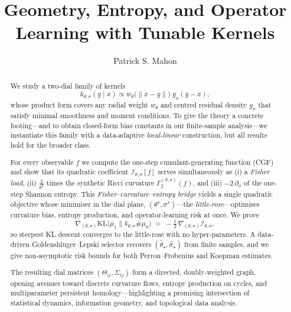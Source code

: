 \documentclass{article}
\theoremstyle{plain}
\theoremstyle{definition}
\theoremstyle{remark}
\begin{document}
\title{Geometry, Entropy, and Operator Learning with Tunable Kernels}
\author{Patrick S. Mahon}
\maketitle


\begin{abstract}
We study a two-dial family of kernels  
\[
  k_{\theta,\sigma}(y\mid x)
    \propto w_\theta\!\bigl(\|x-y\|\bigr)\;
      g_\sigma(y-x),
\]
whose product form covers any radial weight \(w_\theta\) and centred
residual density \(g_\sigma\) that satisfy minimal smoothness and
moment conditions.  To give the theory a concrete footing—and to obtain
closed-form bias constants in our finite-sample analysis—we instantiate
this family with a data-adaptive \emph{local-linear} construction, but
all results hold for the broader class.

For every observable \(f\) we compute the one-step cumulant-generating
function (CGF) and show that its quadratic coefficient
\(
  \mathcal I_{\theta,\sigma}[f]
\)
serves simultaneously as  
(i) a \emph{Fisher load},  
(ii) \(\tfrac{2}{\theta^{2}}\) times the synthetic Ricci curvature
\(\Gamma_{2}^{(\theta,\sigma)}(f)\), and  
(iii) \(-2\,\partial_{\sigma}\) of the one-step Shannon entropy.
This \emph{Fisher–curvature–entropy bridge} yields a single quadratic
objective whose minimiser in the dial plane,
\((\theta^{\star},\sigma^{\star})\)—the \emph{little-rose}—optimises
curvature bias, entropy production, and operator-learning risk at once.
We prove
\[
  \nabla_{(\theta,\sigma)}
      \mathrm{KL}\bigl(\mu_1\parallel k_{\theta,\sigma}\!\#\mu_0\bigr)
  \;=\;
  -\tfrac12\,
   \nabla_{(\theta,\sigma)}\mathcal I_{\theta,\sigma},
\]
so steepest KL descent converges to the little-rose with no
hyper-parameters.  A data-driven Goldenshluger–Lepski selector recovers
\((\hat\theta_\star,\hat\sigma_\star)\) from finite samples, and we give
non-asymptotic risk bounds for both Perron–Frobenius and Koopman
estimates.

The resulting dial matrices
\(
  (\Theta_{ij},\Sigma_{ij})
\)
form a directed, doubly-weighted graph, opening avenues toward discrete
curvature flows, entropy production on cycles, and multiparameter
persistent homology—highlighting a promising intersection of statistical dynamics, information geometry, and topological data analysis.
\end{abstract}
\end{document}
